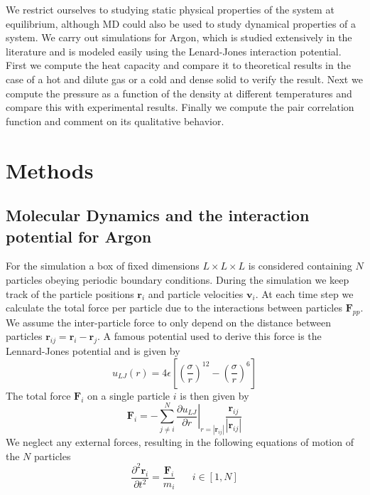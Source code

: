 \documentclass[twoside]{article}
\begin{document}
	We restrict ourselves to studying static physical properties of the system at equilibrium, although MD could also be used to study dynamical properties of a system. We carry out simulations for Argon, which is studied extensively in the literature and is modeled easily using the Lenard-Jones interaction potential. First we compute the heat capacity and compare it to theoretical results in the case of a hot and dilute gas or a cold and dense solid to verify the result. Next we compute the pressure as a function of the density at different temperatures and compare this with experimental results. Finally we compute the pair correlation function and comment on its qualitative behavior.
	
	
	\section{Methods}
	\subsection{Molecular Dynamics and the interaction potential for Argon}
	For the simulation a box of fixed dimensions $L\times L\times L$ is considered containing $N$ particles obeying periodic boundary conditions. During the simulation we keep track of the particle positions $\mathbf{r}_i$ and particle velocities $\mathbf{v}_i$. At each time step we calculate the total force per particle  due to the interactions between particles $\mathbf{F}_{pp}$. 
	We assume the inter-particle force to only depend on the distance between particles $\mathbf{r}_{ij} = \mathbf{r}_i - \mathbf{r}_j$. A famous potential used to derive this force is the Lennard-Jones potential and is given by
	\begin{equation}\label{eq_lj}
	u_{LJ}(r) = 4\epsilon \left[\left(\frac{\sigma}{r}\right)^{12} - \left(\frac{\sigma}{r}\right)^6  \right]
	\end{equation}
	The total force  $\mathbf{F}_i$  on a single particle $i$ is then given by 
	\begin{equation}\label{eq_force_sum}
	\mathbf{F}_i = -\sum_{j\not=i}^N \left.\frac{\partial u_{LJ}}{\partial r}\right|_{r= |\mathbf{r}_{ij}|}  \frac{\mathbf{r}_{ij}}{|\mathbf{r}_{ij}|}
	\end{equation}
	We neglect any external forces, resulting in the following equations of motion of the $N$ particles
	\begin{equation}\label{eq_motion}
	\frac{\partial ^2\mathbf{r}_i}{\partial t^2} = \frac{\mathbf{F}_i}{m_i} \hspace{20pt} i\in [1, N]
	\end{equation}
	
\end{document}
